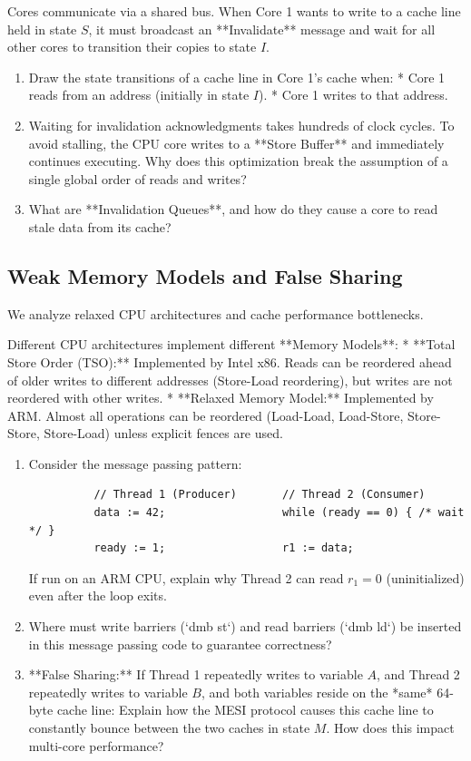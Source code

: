 \documentclass[12pt, a4paper]{book}
\begin{document}
\begin{explobox}
Cores communicate via a shared bus. When Core 1 wants to write to a cache line held in state $S$, it must broadcast an **Invalidate** message and wait for all other cores to transition their copies to state $I$.
\begin{enumerate}[label=(\alph*), leftmargin=*]
  \item Draw the state transitions of a cache line in Core 1's cache when:
        * Core 1 reads from an address (initially in state $I$).
        * Core 1 writes to that address.
  \item Waiting for invalidation acknowledgments takes hundreds of clock cycles.
        To avoid stalling, the CPU core writes to a **Store Buffer** and immediately continues executing.
        Why does this optimization break the assumption of a single global order of reads and writes?
  \item What are **Invalidation Queues**, and how do they cause a core to read stale data from its cache?
\end{enumerate}
\end{explobox}

\subsection{Weak Memory Models and False Sharing}

We analyze relaxed CPU architectures and cache performance bottlenecks.

\begin{explobox}
Different CPU architectures implement different **Memory Models**:
* **Total Store Order (TSO):** Implemented by Intel x86. Reads can be reordered ahead of older writes to different addresses (Store-Load reordering), but writes are not reordered with other writes.
* **Relaxed Memory Model:** Implemented by ARM. Almost all operations can be reordered (Load-Load, Load-Store, Store-Store, Store-Load) unless explicit fences are used.
\begin{enumerate}[label=(\alph*), leftmargin=*]
  \item Consider the message passing pattern:
        \begin{verbatim}
          // Thread 1 (Producer)       // Thread 2 (Consumer)
          data := 42;                  while (ready == 0) { /* wait */ }
          ready := 1;                  r1 := data;
        \end{verbatim}
        If run on an ARM CPU, explain why Thread 2 can read $r_1 = 0$ (uninitialized) even after the loop exits.
  \item Where must write barriers (`dmb st`) and read barriers (`dmb ld`) be inserted in this message passing code to guarantee correctness?
  \item **False Sharing:** If Thread 1 repeatedly writes to variable $A$, and Thread 2 repeatedly writes to variable $B$, and both variables reside on the *same* 64-byte cache line:
        Explain how the MESI protocol causes this cache line to constantly bounce between the two caches in state $M$. How does this impact multi-core performance?
\end{enumerate}
\end{explobox}
\end{document}
